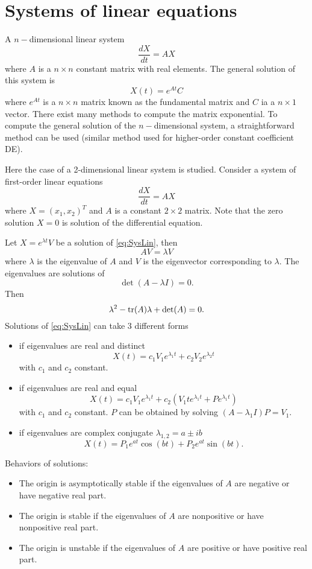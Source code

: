 \section{Systems of linear equations}
A $n-$dimensional linear system
$$\frac{dX}{dt}=A X$$
where $A$ is a $n\times n$ constant matrix with real elements. The general solution of this system is
$$X(t)=e^{At}C$$
where $e^{At}$ is a $n\times n$ matrix known as the fundamental matrix and $C$ ia a $n\times 1$ vector. There exist many methods to compute the matrix exponential. To compute the general solution of the $n-$dimensional system, a straightforward method can be used (similar method used for higher-order constant coefficient DE).




Here the case of a 2-dimensional linear system is studied. 
Consider a system of first-order linear equations
\begin{equation}
\frac{dX}{dt}=A X
\label{eq:SysLin}
\end{equation}
where $X=(x_1,x_2)^T$ and $A$ is a constant $2\times 2$ matrix. Note that the zero solution $X=0$ is solution of the differential equation. 

Let $X=e^{\lambda t}V$ be a solution of \eqref{eq:SysLin}, then
$$AV=\lambda V$$
where $\lambda $ is the eigenvalue of $A$ and $V$ is the eigenvector corresponding to $\lambda$. The eigenvalues are solutions of $$\det (A-\lambda I)=0.$$
Then
$$\lambda ^2 -\textrm{tr} (A) \lambda + \det (A)=0.$$
Solutions of \eqref{eq:SysLin} can take 3 different forms
\begin{itemize}
\item if eigenvalues are real and distinct
$$X(t)=c_1V_1 e^{\lambda _1t}+c_2V_2 e^{\lambda _2t}$$
with $c_1$ and $c_2$ constant.
\item if eigenvalues are real and equal
$$X(t)=c_1V_1 e^{\lambda _1t}+c_2\left (V_1te^{\lambda _1t}+P e^{\lambda _1t}\right )$$
with $c_1$ and $c_2$ constant. $P$ can be obtained by solving $(A-\lambda _1 I)P=V_1$.
\item if eigenvalues are complex conjugate $\lambda _{1,2}=a\pm i b$
$$X(t)=P_1 e^{at} \cos (bt) + P_2 e^{at}\sin (bt).$$
\end{itemize}
Behaviors of solutions:
\begin{itemize}
\item The origin is asymptotically stable if the eigenvalues of $A$ are negative or have negative real part.
\item The origin is stable if the eigenvalues of $A$ are nonpositive or have nonpositive real part.
\item The origin is unstable if the eigenvalues of $A$ are positive or have positive real part.
\end{itemize}


